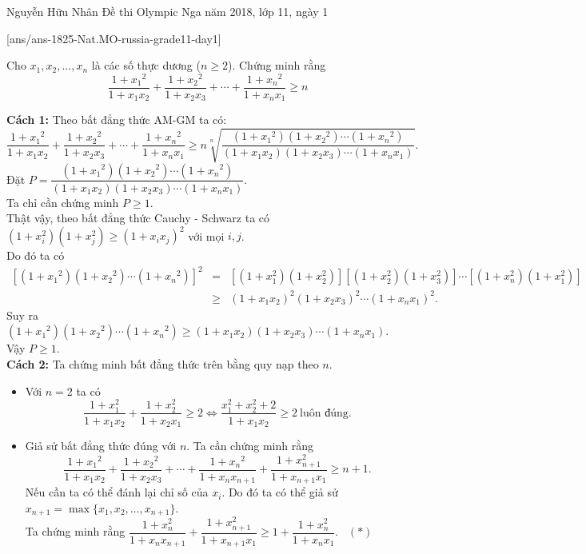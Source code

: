 
\begin{name}
{Nguyễn Hữu Nhân}
{Đề thi Olympic Nga năm 2018, lớp 11, ngày 1}
\end{name}
\setcounter{ex}{0}
[ans/ans-1825-Nat.MO-russia-grade11-day1]

\begin{ex}%
	Cho $x_1, x_2,...,x_n$ là các số thực dương ($n\geq 2$). Chứng minh rằng
	$$\dfrac{1+{x_1}^2}{1+x_1x_2} + \dfrac{1+{x_2}^2}{1+x_2x_3}+ \cdots +\dfrac{1+{x_n}^2}{1+x_nx_1} \geq n$$
	\loigiai
	{\textbf{Cách 1:} Theo bất đẳng thức AM-GM ta có:
		$$\dfrac{1+{x_1}^2}{1+x_1x_2} + \dfrac{1+{x_2}^2}{1+x_2x_3} + \cdots + \dfrac{1+{x_n}^2}{1+x_nx_1} \geq n\sqrt[n]{\dfrac{(1+{x_1}^2)(1+{x_2}^2) \cdots (1+{x_n}^2)}{(1+x_1x_2)(1+x_2x_3) \cdots (1+x_nx_1)}}.$$
		Đặt $P = \dfrac{(1+{x_1}^2)(1+{x_2}^2) \cdots (1+{x_n}^2)}{(1+x_1 x_2)(1+x_2x_3) \cdots (1+x_nx_1)}$.
		\\	Ta chỉ cần chứng minh $P\geq 1$.
		\\	Thật vậy, theo bất đẳng thức Cauchy - Schwarz ta có $  (1+x_i^2)(1+x_j^2) \geq (1+x_i x_j)^2$ với mọi $i,j$. \\
		Do đó ta có 
		\begin{eqnarray*}
		\left[ (1+{x_1}^2)(1+{x_2}^2) \cdots (1+{x_n}^2) \right]^2  &=&  \left[ (1+ x_1^2)(1+x_2^2) \right]  \left[ (1+x_2^2)(1+x_3^2) \right] \cdots \left[ (1+x_n^2) (1+x_1^2) \right] \\
		&\geq & (1+x_1x_2)^2 (1+x_2x_3)^2 \cdots (1+x_n x_1)^2.
		\end{eqnarray*}
		Suy ra $(1+{x_1}^2)(1+{x_2}^2) \cdots (1+{x_n}^2) \geq (1+x_1 x_2)(1+x_2x_3) \cdots (1+x_nx_1)$. Vậy $P \geq 1$.
		\\ \textbf{Cách 2:} Ta chứng minh bất đẳng thức trên bằng quy nạp theo $n$.		
		\begin{itemize}
			\item Với $n=2$ ta có $$ \dfrac{1+x_1^2}{1+x_1x_2}+\dfrac{1+x_2^2}{1+x_2x_1} \ge 2 \Leftrightarrow \dfrac{x_1^2+x_2^2+2}{1+x_1x_2} \ge 2 ~\text{luôn đúng}. $$ 
			\item Giả sử bất đẳng thức đúng với $n$. Ta cần chứng minh rằng $$\dfrac{1+{x_1}^2}{1+x_1x_2}+ \dfrac{1+{x_2}^2}{1+x_2x_3} + \cdots + \dfrac{1+{x_n}^2}{1+x_nx_{n+1}} + \dfrac{1+x_{n+1}^2}{1+x_{n+1}x_1} \geq n+1.$$
			Nếu cần ta có thể đánh lại chỉ số của $x_i$. Do đó ta có thể giả sử $x_{n+1}= \max \{ x_1, x_2, \ldots , x_{n+1}\}$.
			\\ Ta chứng minh rằng $\dfrac{1+ x_n^2}{1+ x_{n}x_{n+1}} + \dfrac{1+x_{n+1}^2}{1+ x_{n+1}x_1} \geq 1+ \dfrac{1+x_n^2}{1+ x_nx_1}$. \ $(*)$

\end{itemize}}
\end{ex}
